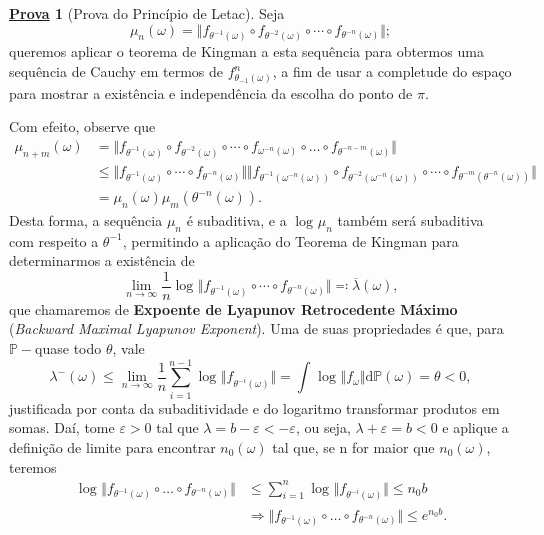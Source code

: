 \documentclass[12pt, a4paper]{article}
\theoremstyle{definition}
\newtheorem*{proof*}{\underline{Prova}}
\begin{document}
\begin{proof*} [Prova do Princípio de Letac]
	Seja
	\[
		\mu_{n}(\omega )=\Vert f_{\theta^{-1}(\omega )}\circ f_{\theta^{-2}(\omega )}\circ\cdots\circ f_{\theta^{-n}(\omega )} \Vert;
	\]
	queremos aplicar o teorema de Kingman a esta sequência para obtermos uma sequência de Cauchy em termos de \(f_{\theta_{-1}(\omega )}^{n}\), a fim de usar a completude do espaço para mostrar a existência e independência da escolha do ponto de \(\pi \).

	Com efeito, observe que
	\begin{align*}
		\mu_{n+m}(\omega ) & =\Vert f_{\theta^{-1}(\omega )}\circ f_{\theta^{-2}(\omega )}\circ\cdots \circ f_{\omega^{-n}(\omega )}\circ \dotsc \circ f_{\theta^{-n-m}(\omega )} \Vert                                                                            \\
		                   & \leq \Vert f_{\theta^{-1}(\omega )}\circ \cdots\circ f_{\theta^{-n}(\omega )} \Vert \Vert f_{\theta^{-1}(\omega^{-n}(\omega))}\circ f_{\theta^{-2}(\omega^{-n}(\omega ))}\circ\cdots\circ f_{\theta^{-m}(\theta^{-n}(\omega ))} \Vert \\
		                   & = \mu_{n}(\omega )\mu_{m}(\theta^{-n}(\omega )).
	\end{align*}
	Desta forma, a sequência \(\mu_{n}\) é subaditiva, e a \(\log^{}{\mu_{n}}\) também será subaditiva com respeito a \(\theta^{-1}\), permitindo a aplicação do Teorema de Kingman para determinarmos a existência de
	\[
		\lim_{n\to \infty}\frac{1}{n}\log^{}{\Vert f_{\theta^{-1}(\omega )}\circ \cdots\circ f_{\theta^{-n}(\omega )} \Vert} \eqqcolon \overline{\lambda }(\omega ),
	\]
	que chamaremos de \textbf{Expoente de Lyapunov Retrocedente Máximo} (\textit{Backward Maximal Lyapunov Exponent}). Uma de suas propriedades é que, para \(\mathbb{P}-\)quase todo \(\theta \), vale
	\[
		\lambda^{-}(\omega )\leq \lim_{n\to \infty}\frac{1}{n}\sum\limits_{i=1}^{n-1}\log^{}{\Vert f_{\theta^{-i}(\omega )} \Vert} = \int_{}^{}\log^{}{\Vert f_{\omega } \Vert} \mathrm{d}\mathbb{P}(\omega )=\theta <0,
	\]
	justificada por conta da subaditividade e do logaritmo transformar produtos em somas. Daí, tome \(\varepsilon >0\) tal que \(\lambda = b -\varepsilon < -\varepsilon \), ou seja, \(\lambda +\varepsilon =b < 0\) e aplique a definição de limite para encontrar \(n_{0}(\omega )\) tal que, se n for maior que \(n_{0}(\omega )\), teremos
	\begin{align*}
		\log^{}{\Vert f_{\theta^{-1}(\omega )}\circ \dotsc \circ f_{\theta^{-n}(\omega )} \Vert} & \leq \sum\limits_{i=1}^{n}\log^{}{\Vert f_{\theta^{-i}(\omega )} \Vert} \leq n_{0}b                          \\
		                                                                                         & \Rightarrow \Vert f_{\theta^{-1}(\omega )}\circ \dotsc \circ f_{\theta^{-n}(\omega )} \Vert \leq e^{n_{0}b}.
	\end{align*}


\end{proof*}
\end{document}
